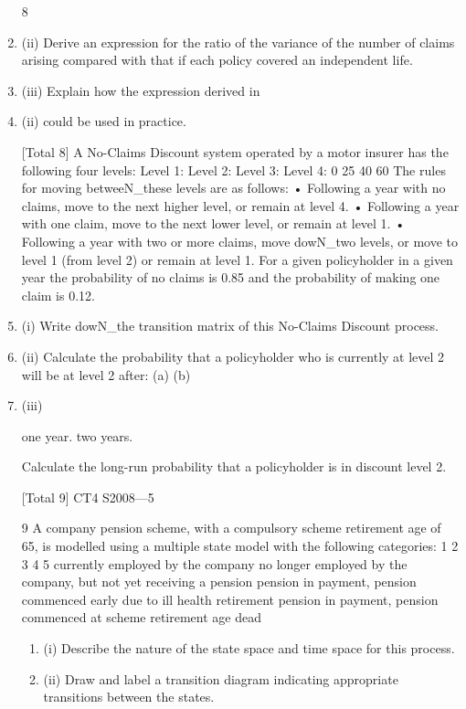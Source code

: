 \documentclass[a4paper,12pt]{article}
\begin{document}
\begin{enumerate}
8
\item (ii) Derive an expression for the ratio of the variance of the number of claims
arising compared with that if each policy covered an independent life.

\item (iii) Explain how the expression derived in \item (ii) could be used in practice.

[Total 8]
A No-Claims Discount system operated by a motor insurer has the following four
levels:
Level 1:
Level 2:
Level 3:
Level 4:
0%
25%
40%
60%
The rules for moving betweeN_these levels are as follows:
• Following a year with no claims, move to the next higher level, or remain at
level 4.
• Following a year with one claim, move to the next lower level, or remain at
level 1.
• Following a year with two or more claims, move dowN_two levels, or move to
level 1 (from level 2) or remain at level 1.
For a given policyholder in a given year the probability of no claims is 0.85 and the
probability of making one claim is 0.12.
\item (i) Write dowN_the transition matrix of this No-Claims Discount process.
\item (ii) Calculate the probability that a policyholder who is currently at level 2 will be
at level 2 after:
(a)
(b)
\item (iii)

one year.
two years.

Calculate the long-run probability that a policyholder is in discount level 2.

[Total 9]
CT4 S2008—5

\newpage

9
A company pension scheme, with a compulsory scheme retirement age of 65, is
modelled using a multiple state model with the following categories:
1
2
3
4
5 currently employed by the company
no longer employed by the company, but not yet receiving a pension
pension in payment, pension commenced early due to ill health retirement
pension in payment, pension commenced at scheme retirement age
dead

\begin{enumerate}
\item (i) Describe the nature of the state space and time space for this process.
\item (ii) Draw and label a transition diagram indicating appropriate transitions between
the states.
\end{enumerate}




\end{enumerate}
\end{document}
